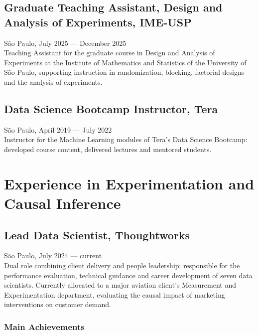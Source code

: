 \documentclass{article}
\newcommand{\jobdate}[3]{
\large
\vspace{0.05em}
  {#1, #2 --- #3}
\vspace{0.5em}
\\
}
\begin{document}
\vspace{1em}

\subsection{Graduate Teaching Assistant, Design and Analysis of Experiments, IME-USP}
\jobdate{São Paulo}{July 2025}{December 2025}
Teaching Assistant for the graduate course in Design and Analysis of Experiments at the Institute of Mathematics and Statistics of the University of São Paulo, supporting instruction in randomization, blocking, factorial designs and the analysis of experiments.

\vspace{1em}

\subsection{Data Science Bootcamp Instructor, Tera}
\jobdate{São Paulo}{April 2019}{July 2022}
Instructor for the Machine Learning modules of Tera's Data Science Bootcamp: developed course content, delivered lectures and mentored students.


\section{Experience in Experimentation and Causal Inference}

\subsection{Lead Data Scientist, Thoughtworks}
\jobdate{São Paulo}{July 2024}{current}
Dual role combining client delivery and people leadership: responsible for the performance evaluation, technical guidance and career development of seven data scientists. Currently allocated to a major aviation client's Measurement and Experimentation department, evaluating the causal impact of marketing interventions on customer demand.
\subsubsection{Main Achievements}
\end{document}
